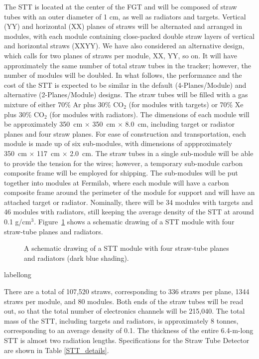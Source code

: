 The STT is located at the center of the FGT and 
will be composed of straw tubes with an outer diameter of 1 cm, as well as 
radiators and targets. 
Vertical (YY) and horizontal (XX) planes of straws will be alternated and 
arranged in modules, with each module containing close-packed double straw layers 
of vertical and horizontal straws (XXYY). 
We have also considered an alternative design, which calls for two planes of straws
per module, XX, YY, so on. It will have approximately the same number of
total straw tubes in the tracker; however, the number of modules will be doubled.
In what follows, the performance and the cost of the STT is expected to be similar 
in the default (4-Planes/Module) and alternative (2-Planes/Module) designs.
The straw tubes will be filled with a
gas mixture of either 70\% Ar plus 30\% CO$_2$ (for modules with targets) or
70\% Xe plus 30\% CO$_2$ (for modules with radiators).
The dimensions of each module will
be approximately 350~cm $\times$ 350~cm $\times$ 8.0~cm, including 
target or radiator planes and four straw planes. For ease of construction and
transportation, each module is made up of six sub-modules, with dimensions of
appproximately 350~cm $\times$ 117~cm $\times$ 2.0~cm. 
The straw tubes in a single sub-module will be able to provide the tension 
for the wires; however, a temporary sub-module carbon composite frame will 
be employed for shipping. The sub-modules will be put together into modules 
at Fermilab, where each module will have a carbon composite frame around 
the perimeter of the module for support and will have an attached target or 
radiator. Nominally, there will be 34 modules with targets and 46 modules 
with radiators, still keeping the 
average density of the STT at around 0.1 g/cm$^3$. Figure~\ref{STT_Detail}
shows a schematic drawing of a STT module with four straw-tube planes and
radiators.

\begin{figure}
\begin{center}
\label{STT_Detail}
\caption{A schematic drawing of a STT module with four straw-tube planes and
radiators (dark blue shading).}
\end{center}
\end{figure}
\begin{cdrfigure}[short]{label}{long}
\end{cdrfigure}
There are a total of 107,520 straws, corresponding to 336 straws per plane,
1344 straws per module,
and 80 modules. Both ends of the straw tubes will be read out, so that the total
number of electronics channels will be 215,040. 
The total mass of the STT, including targets and radiators, is approximately 8 
tonnes, corresponding to an average density of 0.1. 
The thickness of the entire 6.4-m-long STT is almost two 
radiation lengths. Specifications for the Straw Tube Detector are shown in Table \ref{STT_details}.

